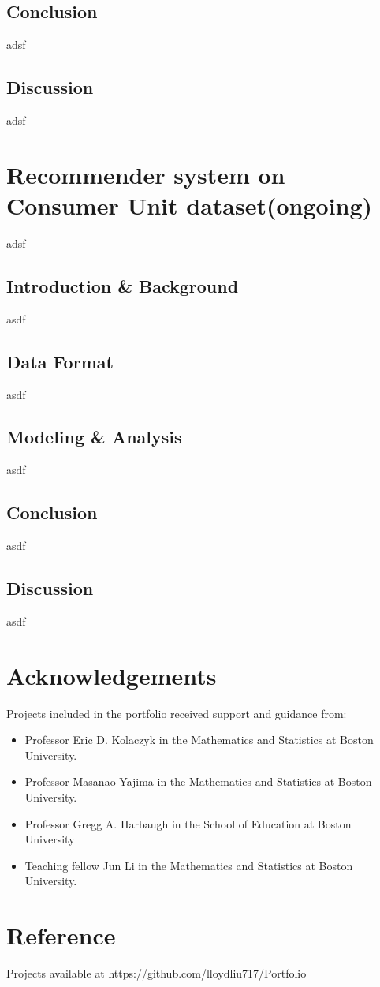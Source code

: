 \documentclass{article}
\begin{document}
	\subsection{Conclusion}
	adsf
	\subsection{Discussion}
	adsf
	
	\section{Recommender system on Consumer Unit dataset(ongoing)}
	adsf
	\subsection{Introduction \& Background}
	asdf
	\subsection{Data Format}
	asdf
	\subsection{Modeling \& Analysis}
	asdf
	\subsection{Conclusion}
	asdf
	\subsection{Discussion}
	asdf
	
	\section{Acknowledgements}
	Projects included in the portfolio received support and guidance from:
	\begin{itemize}
		\item Professor Eric D. Kolaczyk in the Mathematics and Statistics at Boston University.
		\item Professor Masanao Yajima in the Mathematics and Statistics at Boston University.
		\item Professor Gregg A. Harbaugh in the School of Education at Boston University
		\item Teaching fellow Jun Li in the Mathematics and Statistics at Boston University.
	\end{itemize}
	\section{Reference}
	Projects available at https://github.com/lloydliu717/Portfolio
\end{document}
